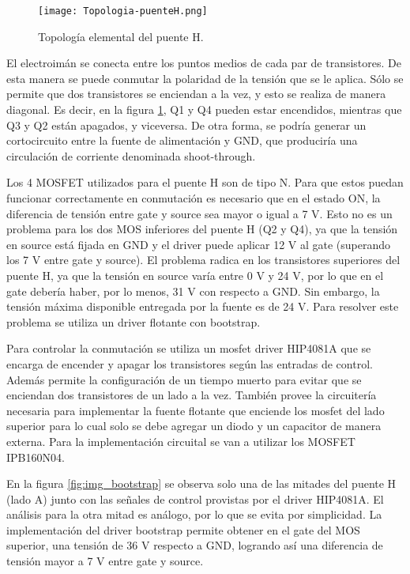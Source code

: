 \begin{figure}[H]
	\centering
	\texttt{[image: Topologia-puenteH.png]}
	\caption{Topología elemental del puente H.}
	\label{fig:img_topologia-puenteH}
\end{figure}

\noindent El electroimán se conecta entre los puntos medios de cada par de transistores. De esta manera se puede conmutar la polaridad de la tensión que se le aplica. Sólo se permite que dos transistores se enciendan a la vez, y esto se realiza de manera diagonal. Es decir, en la figura \ref{fig:img_topologia-puenteH}, Q1 y Q4 pueden estar encendidos, mientras que Q3 y Q2 están apagados, y viceversa. De otra forma, se podría generar un cortocircuito entre la fuente de alimentación y GND, que produciría una circulación de corriente denominada shoot-through. 


\noindent Los 4 MOSFET utilizados para el puente H son de tipo N. Para que estos puedan funcionar correctamente en conmutación es necesario que en el estado ON, la diferencia de tensión entre gate y source sea mayor o igual a 7 V. Esto no es un problema para los dos MOS inferiores del puente H (Q2 y Q4), ya que la tensión en source está fijada en GND y el driver puede aplicar 12 V al gate (superando los 7 V entre gate y source). El problema radica en los transistores superiores del puente H, ya que la tensión en source varía entre 0 V y 24 V, por lo que en el gate debería haber, por lo menos, 31 V con respecto a GND. Sin embargo, la tensión máxima disponible entregada por la fuente es de 24 V. Para resolver este problema se utiliza un driver flotante con bootstrap.

\noindent Para controlar la conmutación se utiliza un mosfet driver HIP4081A que se encarga de encender y apagar los transistores según las entradas de control. Además permite la configuración de un tiempo muerto para evitar que se enciendan dos transistores de un lado a la vez. También provee la circuitería necesaria para implementar la fuente flotante que enciende los mosfet del lado superior para lo cual solo se debe agregar un diodo y un capacitor de manera externa. Para la implementación circuital se van a utilizar los MOSFET IPB160N04.

\noindent En la figura \ref{fig:img_bootstrap} se observa solo una de las mitades del puente H (lado A)  junto con las señales de control provistas por el driver HIP4081A. El análisis para la otra mitad es análogo, por lo que se evita por simplicidad. La implementación del driver bootstrap permite obtener en el gate del MOS superior, una tensión de 36 V respecto a GND, logrando así una diferencia de tensión mayor a 7 V entre gate y source. 

